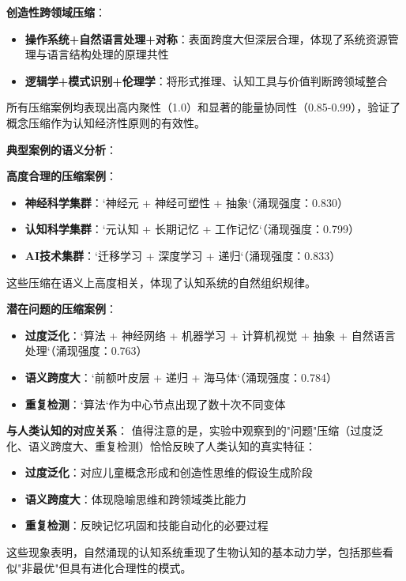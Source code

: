 \documentclass[12pt,a4paper]{article}
\begin{document}
\textbf{创造性跨领域压缩}：
\begin{itemize}
    \item \textbf{操作系统+自然语言处理+对称}：表面跨度大但深层合理，体现了系统资源管理与语言结构处理的原理共性
    \item \textbf{逻辑学+模式识别+伦理学}：将形式推理、认知工具与价值判断跨领域整合
\end{itemize}

所有压缩案例均表现出高内聚性（1.0）和显著的能量协同性（0.85-0.99），验证了概念压缩作为认知经济性原则的有效性。

\textbf{典型案例的语义分析}：

\textbf{高度合理的压缩案例}：
\begin{itemize}
\item \textbf{神经科学集群}：`神经元 + 神经可塑性 + 抽象`（涌现强度：0.830）
\item \textbf{认知科学集群}：`元认知 + 长期记忆 + 工作记忆`（涌现强度：0.799）  
\item \textbf{AI技术集群}：`迁移学习 + 深度学习 + 递归`（涌现强度：0.833）
\end{itemize}

这些压缩在语义上高度相关，体现了认知系统的自然组织规律。

\textbf{潜在问题的压缩案例}：
\begin{itemize}
\item \textbf{过度泛化}：`算法 + 神经网络 + 机器学习 + 计算机视觉 + 抽象 + 自然语言处理`（涌现强度：0.763）
\item \textbf{语义跨度大}：`前额叶皮层 + 递归 + 海马体`（涌现强度：0.784）
\item \textbf{重复检测}：`算法`作为中心节点出现了数十次不同变体
\end{itemize}

\textbf{与人类认知的对应关系}：
值得注意的是，实验中观察到的"问题"压缩（过度泛化、语义跨度大、重复检测）恰恰反映了人类认知的真实特征：

\begin{itemize}
\item \textbf{过度泛化}：对应儿童概念形成和创造性思维的假设生成阶段
\item \textbf{语义跨度大}：体现隐喻思维和跨领域类比能力  
\item \textbf{重复检测}：反映记忆巩固和技能自动化的必要过程
\end{itemize}

这些现象表明，自然涌现的认知系统重现了生物认知的基本动力学，包括那些看似"非最优"但具有进化合理性的模式。
\end{document}
